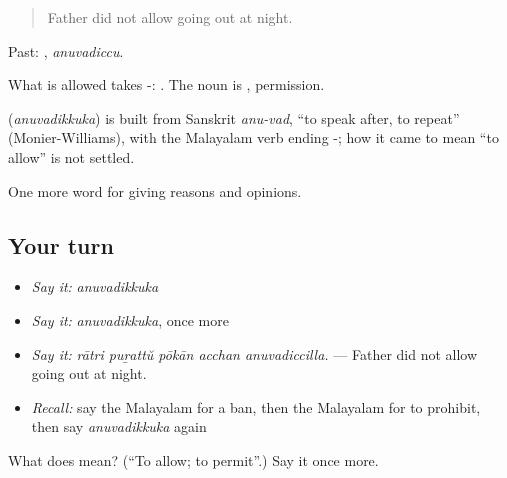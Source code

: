 \begin{quote}
Father did not allow going out at night.
\end{quote}

Past: , \emph{anuvadiccu}.

What is allowed takes -:  . The noun is , permission.

\begin{cousinweb}
\textbf{} (\emph{anuvadikkuka}) is built from Sanskrit \emph{anu-vad}, \textquotedblleft{}to speak after, to repeat\textquotedblright{} (Monier-Williams), with the Malayalam verb ending -; how it came to mean \textquotedblleft{}to allow\textquotedblright{} is not settled.
\end{cousinweb}

\begin{grammarlens}[title={What you've built}]
One more word for giving reasons and opinions.
\end{grammarlens}

\subsection*{Your turn}
\begin{itemize}
\raggedright
  \item \emph{Say it:} \emph{anuvadikkuka}
  \item \emph{Say it:} \emph{anuvadikkuka}, once more
  \item \emph{Say it:} \emph{rātri puṟattŭ pōkān acchan anuvadiccilla.} — Father did not allow going out at night.
  \item \emph{Recall:} say the Malayalam for a ban, then the Malayalam for to prohibit, then say \emph{anuvadikkuka} again
\end{itemize}

\begin{tcolorbox}[breakable,colback=teal!4,colframe=teal!35!black,title={Before you move on}]
What does  mean? (\textquotedblleft{}To allow; to permit\textquotedblright{}.) Say it once more.
\end{tcolorbox}
